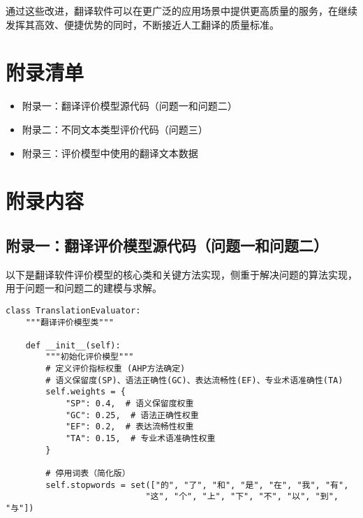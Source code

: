 \documentclass[bwprint]{cumcmthesis}
\begin{document}
通过这些改进，翻译软件可以在更广泛的应用场景中提供更高质量的服务，在继续发挥其高效、便捷优势的同时，不断接近人工翻译的质量标准。

\nocite{*}

\newpage
\begin{appendices}
\section{附录清单}
\begin{itemize}

\item 附录一：翻译评价模型源代码（问题一和问题二）
\item 附录二：不同文本类型评价代码（问题三）
\item 附录三：评价模型中使用的翻译文本数据
\end{itemize}

\section{附录内容}

\subsection{附录一：翻译评价模型源代码（问题一和问题二）}
以下是翻译软件评价模型的核心类和关键方法实现，侧重于解决问题的算法实现，用于问题一和问题二的建模与求解。

\begin{lstlisting}[style=pythonstyle, caption={翻译评价模型核心类}]
class TranslationEvaluator:
    """翻译评价模型类"""

    def __init__(self):
        """初始化评价模型"""
        # 定义评价指标权重 (AHP方法确定)
        # 语义保留度(SP)、语法正确性(GC)、表达流畅性(EF)、专业术语准确性(TA)
        self.weights = {
            "SP": 0.4,  # 语义保留度权重
            "GC": 0.25,  # 语法正确性权重
            "EF": 0.2,  # 表达流畅性权重
            "TA": 0.15,  # 专业术语准确性权重
        }

        # 停用词表（简化版）
        self.stopwords = set(["的", "了", "和", "是", "在", "我", "有", 
                            "这", "个", "上", "下", "不", "以", "到", "与"])
\end{lstlisting}


\end{appendices}
\end{document}
